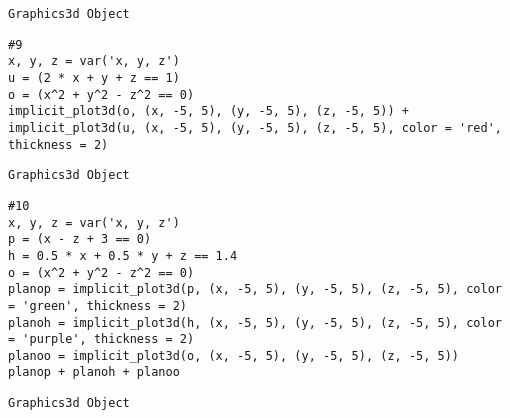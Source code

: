 \documentclass[
]{article}
\begin{document}
\begin{verbatim}
Graphics3d Object
\end{verbatim}

\begin{verbatim}
#9
x, y, z = var('x, y, z')
u = (2 * x + y + z == 1) 
o = (x^2 + y^2 - z^2 == 0)
implicit_plot3d(o, (x, -5, 5), (y, -5, 5), (z, -5, 5)) + implicit_plot3d(u, (x, -5, 5), (y, -5, 5), (z, -5, 5), color = 'red', thickness = 2)
\end{verbatim}

\begin{verbatim}
Graphics3d Object
\end{verbatim}

\begin{verbatim}
#10
x, y, z = var('x, y, z')
p = (x - z + 3 == 0)
h = 0.5 * x + 0.5 * y + z == 1.4
o = (x^2 + y^2 - z^2 == 0)
planop = implicit_plot3d(p, (x, -5, 5), (y, -5, 5), (z, -5, 5), color = 'green', thickness = 2)
planoh = implicit_plot3d(h, (x, -5, 5), (y, -5, 5), (z, -5, 5), color = 'purple', thickness = 2)
planoo = implicit_plot3d(o, (x, -5, 5), (y, -5, 5), (z, -5, 5))
planop + planoh + planoo
\end{verbatim}

\begin{verbatim}
Graphics3d Object
\end{verbatim}
\end{document}
